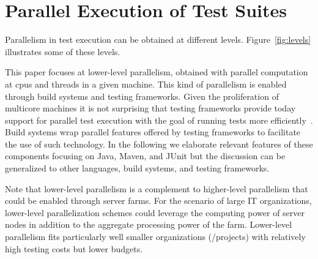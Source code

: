 \section{Parallel Execution of Test Suites}
\label{sec:modes}

  Parallelism in test execution can be obtained at different
levels.  Figure~\ref{fig:levels} illustrates some of these levels.

This paper focuses at lower-level parallelism, obtained with parallel
computation at cpus and threads in a given machine.  This kind of
parallelism is enabled through build systems and testing frameworks.
Given the proliferation of multicore machines it is not surprising
that testing frameworks provide today support for parallel test
execution with the goal of running tests more
efficiently~\cite{junit-org,testng,nunit}.  Build systems wrap
parallel features offered by testing frameworks to facilitate the use
of such technology\cite{maven-surefire-plugin}.  In the following we
elaborate relevant features of these components focusing on Java,
Maven, and JUnit but the discussion can be generalized to other
languages, build systems, and testing frameworks.

Note that lower-level parallelism is a complement to higher-level
parallelism that could be enabled through server farms.  For the
scenario of large IT organizations, lower-level parallelization
schemes could leverage the computing power of server nodes in addition
to the aggregate processing power of the farm.  Lower-level
parallelism fits particularly well smaller organizations (/projects)
with relatively high testing costs but lower budgets.


